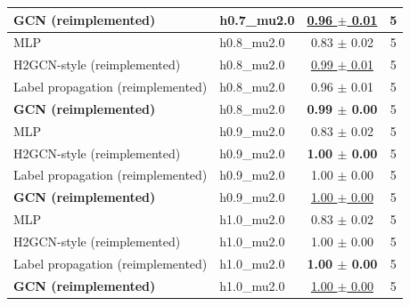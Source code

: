\begin{tabular}{llcc}
\textbf{GCN (reimplemented)} & h0.7\_mu2.0 & \underline{0.96 $\pm$ 0.01} & 5 \\
\midrule
MLP & h0.8\_mu2.0 & 0.83 $\pm$ 0.02 & 5 \\
H2GCN-style (reimplemented) & h0.8\_mu2.0 & \underline{0.99 $\pm$ 0.01} & 5 \\
Label propagation (reimplemented) & h0.8\_mu2.0 & 0.96 $\pm$ 0.01 & 5 \\
\textbf{GCN (reimplemented)} & h0.8\_mu2.0 & \textbf{0.99 $\pm$ 0.00} & 5 \\
\midrule
MLP & h0.9\_mu2.0 & 0.83 $\pm$ 0.02 & 5 \\
H2GCN-style (reimplemented) & h0.9\_mu2.0 & \textbf{1.00 $\pm$ 0.00} & 5 \\
Label propagation (reimplemented) & h0.9\_mu2.0 & 1.00 $\pm$ 0.00 & 5 \\
\textbf{GCN (reimplemented)} & h0.9\_mu2.0 & \underline{1.00 $\pm$ 0.00} & 5 \\
\midrule
MLP & h1.0\_mu2.0 & 0.83 $\pm$ 0.02 & 5 \\
H2GCN-style (reimplemented) & h1.0\_mu2.0 & 1.00 $\pm$ 0.00 & 5 \\
Label propagation (reimplemented) & h1.0\_mu2.0 & \textbf{1.00 $\pm$ 0.00} & 5 \\
\textbf{GCN (reimplemented)} & h1.0\_mu2.0 & \underline{1.00 $\pm$ 0.00} & 5 \\
\bottomrule
\end{tabular}

